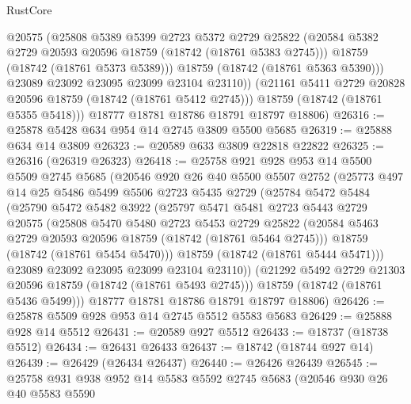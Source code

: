 \begin{lexlean}{RustCore}
\begin{coremodule}
              @20575
              (@25808
                @5389
                @5399
                @2723
                @5372
                @2729
                @25822
                (@20584 @5382 @2729 @20593 @20596 @18759 (@18742 (@18761 @5383 @2745)))
                @18759
                (@18742 (@18761 @5373 @5389)))
              @18759
              (@18742 (@18761 @5363 @5390)))
            @23089
            @23092
            @23095
            @23099
            @23104
            @23110))
        (@21161 @5411 @2729 @20828 @20596 @18759 (@18742 (@18761 @5412 @2745)))
        @18759
        (@18742 (@18761 @5355 @5418)))
      @18777
      @18781
      @18786
      @18791
      @18797
      @18806)
@26316 := @25878 @5428 @634 @954 @14 @2745 @3809 @5500 @5685
@26319 := @25888 @634 @14 @3809
@26323 := @20589 @633 @3809 @22818 @22822
@26325 := @26316 (@26319 @26323)
@26418 := @25758
    @921
    @928
    @953
    @14
    @5500
    @5509
    @2745
    @5685
    (@20546
      @920
      @26
      @40
      @5500
      @5507
      @2752
      (@25773
        @497
        @14
        @25
        @5486
        @5499
        @5506
        @2723
        @5435
        @2729
        (@25784
          @5472
          @5484
          (@25790
            @5472
            @5482
            @3922
            (@25797
              @5471
              @5481
              @2723
              @5443
              @2729
              @20575
              (@25808
                @5470
                @5480
                @2723
                @5453
                @2729
                @25822
                (@20584 @5463 @2729 @20593 @20596 @18759 (@18742 (@18761 @5464 @2745)))
                @18759
                (@18742 (@18761 @5454 @5470)))
              @18759
              (@18742 (@18761 @5444 @5471)))
            @23089
            @23092
            @23095
            @23099
            @23104
            @23110))
        (@21292 @5492 @2729 @21303 @20596 @18759 (@18742 (@18761 @5493 @2745)))
        @18759
        (@18742 (@18761 @5436 @5499)))
      @18777
      @18781
      @18786
      @18791
      @18797
      @18806)
@26426 := @25878 @5509 @928 @953 @14 @2745 @5512 @5583 @5683
@26429 := @25888 @928 @14 @5512
@26431 := @20589 @927 @5512
@26433 := @18737 (@18738 @5512)
@26434 := @26431 @26433
@26437 := @18742 (@18744 @927 @14)
@26439 := @26429 (@26434 @26437)
@26440 := @26426 @26439
@26545 := @25758
    @931
    @938
    @952
    @14
    @5583
    @5592
    @2745
    @5683
    (@20546
      @930
      @26
      @40
      @5583
      @5590

\end{coremodule}
\end{lexlean}
